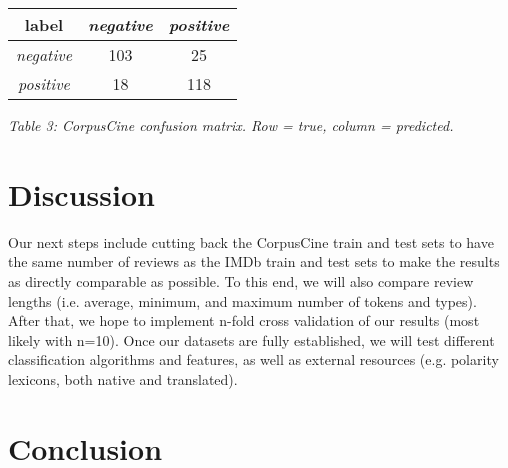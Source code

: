 \documentclass[11pt]{article}
\begin{document}
\vspace{5mm}
{\centering
\begin{tabular}{|c|c|c|}
\hline
\textbf{label} & \emph{negative} & \emph{positive} \\ \hline
\emph{negative} & 103 & 25 \\ \hline
\emph{positive} & 18 & 118 \\ \hline
\end{tabular}

\vspace{1mm}
\emph{Table 3: CorpusCine confusion matrix. Row = true, column = predicted.}
\par}

\section{Discussion}

Our next steps include cutting back the CorpusCine train and test sets to have the same number of reviews as the IMDb train and test sets to make the results as directly comparable as possible.  To this end, we will also compare review lengths (i.e. average, minimum, and maximum number of tokens and types).  After that, we hope to implement n-fold cross validation of our results (most likely with n=10).  Once our datasets are fully established, we will test different classification algorithms and features, as well as external resources (e.g. polarity lexicons, both native and translated).

\section{Conclusion}

\nocite{*}




\end{document}
